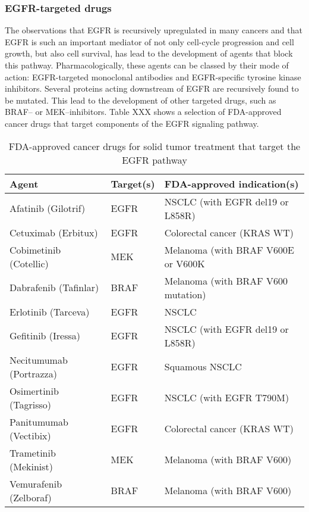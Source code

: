 {{{    \subsubsection{EGFR-targeted drugs}

      The observations that EGFR is recursively upregulated in many cancers
      and that EGFR is such an important mediator of not only cell-cycle
      progression and cell growth, but also cell survival, has lead to the
      development of agents that block this pathway. Pharmacologically,
      these agents can be classed by their mode of action: EGFR-targeted
      monoclonal antibodies and EGFR-specific tyrosine kinase inhibitors.
      Several proteins acting downstream of EGFR are recursively
      found to be mutated. This lead to the development of other targeted
      drugs, such as BRAF-- or MEK--inhibitors. Table XXX shows a selection
      of FDA-approved cancer drugs that target components of the EGFR signaling
      pathway.

      \begin{table}[!htbp]
          \caption[Targeted Cancer Agents]{FDA-approved cancer drugs for solid tumor treatment that target the EGFR pathway}
          \centering
          \begin{tabular}{ |p{4cm}|p{3.7cm}|p{6.3cm}|}
          \hline
          Agent & Target(s) & FDA-approved indication(s) \\ \hline \hline
          Afatinib (Gilotrif) & EGFR & NSCLC (with EGFR del19 or L858R) \\
          Cetuximab (Erbitux) & EGFR & Colorectal cancer (KRAS WT) \\
          Cobimetinib (Cotellic) & MEK & Melanoma (with BRAF V600E or V600K \\
          Dabrafenib (Tafinlar) & BRAF & Melanoma (with BRAF V600 mutation) \\
          Erlotinib (Tarceva) & EGFR & NSCLC \\
          Gefitinib (Iressa) & EGFR & NSCLC (with EGFR del19 or L858R) \\
          Necitumumab (Portrazza) & EGFR & Squamous NSCLC \\
          Osimertinib (Tagrisso) & EGFR & NSCLC (with EGFR T790M) \\
          Panitumumab (Vectibix) & EGFR & Colorectal cancer (KRAS WT) \\
          Trametinib (Mekinist) & MEK & Melanoma (with BRAF V600) \\
          Vemurafenib (Zelboraf) & BRAF & Melanoma (with BRAF V600) \\
          \hline
        \end{tabular}
      \end{table}

}}}
